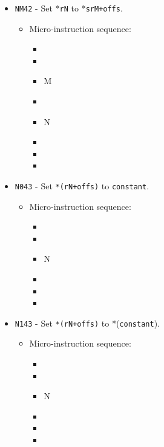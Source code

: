\documentclass{article}
\begin{document}
\begin{itemize}
    \item \Verb|NM42| - Set *\Verb|rN| to *\Verb|srM+offs|.
    \begin{itemize}
        \item Micro-instruction sequence:
        \begin{itemize}
            \item \pkptroutinc
            \item \datatooffs
            \item \regptodatao M
            \item \holddata
            \item \regtoaddr N
            \item \writeRAM
            \item \incrementpk
            \item \done
        \end{itemize}
    \end{itemize}

    \item \Verb|N043| - Set \Verb|*(rN+offs)| to \Verb|constant|.
    \begin{itemize}
        \item Micro-instruction sequence:
        \begin{itemize}
            \item \pkptroutinc
            \item \datatotmpa
            \item \regtoaddr N
            \item \tmpatodata
            \item \writeRAM
            \item \done
        \end{itemize}
    \end{itemize}
    
    \item \Verb|N143| - Set \Verb|*(rN+offs)| to *(\Verb|constant|).
    \begin{itemize}
        \item Micro-instruction sequence:
        \begin{itemize}
            \item \pkptroutinc
            \item \datatotmpa
            \item \regtoaddr N
            \item \tmpaptrout
            \item \writeRAM
            \item \done
        \end{itemize}
    \end{itemize}
    

\end{itemize}
\end{document}
